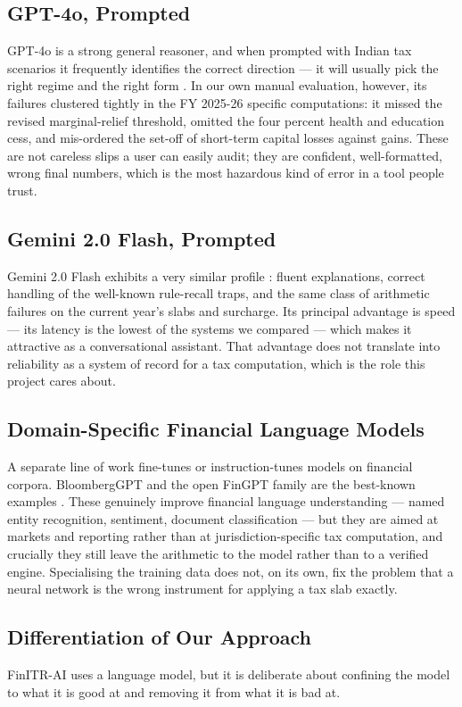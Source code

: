 \documentclass[12pt, a4paper, oneside]{report}
\begin{document}
\subsection{GPT-4o, Prompted}
GPT-4o is a strong general reasoner, and when prompted with Indian tax scenarios
it frequently identifies the correct direction --- it will usually pick the
right regime and the right form \cite{ref4}. In our own manual evaluation,
however, its failures clustered tightly in the FY 2025-26 specific computations:
it missed the revised marginal-relief threshold, omitted the four percent health
and education cess, and mis-ordered the set-off of short-term capital losses
against gains. These are not careless slips a user can easily audit; they are
confident, well-formatted, wrong final numbers, which is the most hazardous kind
of error in a tool people trust.

\subsection{Gemini 2.0 Flash, Prompted}
Gemini 2.0 Flash exhibits a very similar profile \cite{ref5}: fluent
explanations, correct handling of the well-known rule-recall traps, and the same
class of arithmetic failures on the current year's slabs and surcharge. Its
principal advantage is speed --- its latency is the lowest of the systems we
compared --- which makes it attractive as a conversational assistant. That
advantage does not translate into reliability as a system of record for a tax
computation, which is the role this project cares about.

\subsection{Domain-Specific Financial Language Models}
A separate line of work fine-tunes or instruction-tunes models on financial
corpora. BloombergGPT and the open FinGPT family are the best-known examples
\cite{ref6}. These genuinely improve financial language understanding --- named
entity recognition, sentiment, document classification --- but they are aimed at
markets and reporting rather than at jurisdiction-specific tax computation, and
crucially they still leave the arithmetic to the model rather than to a verified
engine. Specialising the training data does not, on its own, fix the problem
that a neural network is the wrong instrument for applying a tax slab exactly.

\subsection{Differentiation of Our Approach}
FinITR-AI uses a language model, but it is deliberate about confining the model
to what it is good at and removing it from what it is bad at.
\end{document}
